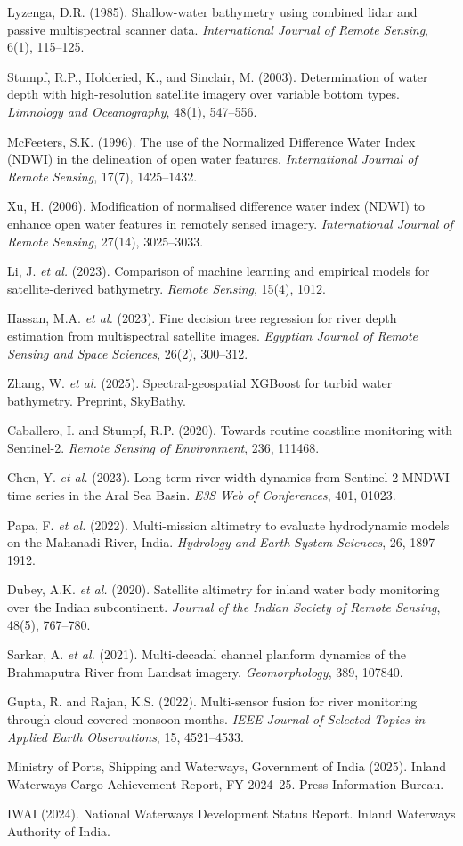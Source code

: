 \documentclass[12pt,a4paper]{article}
\begin{document}
\begin{enumerate}[leftmargin=0.7cm, label={[\arabic*]}]
\item Lyzenga, D.R. (1985). Shallow-water bathymetry using combined lidar and passive multispectral scanner data. \textit{International Journal of Remote Sensing}, 6(1), 115--125.
\item Stumpf, R.P., Holderied, K., and Sinclair, M. (2003). Determination of water depth with high-resolution satellite imagery over variable bottom types. \textit{Limnology and Oceanography}, 48(1), 547--556.
\item McFeeters, S.K. (1996). The use of the Normalized Difference Water Index (NDWI) in the delineation of open water features. \textit{International Journal of Remote Sensing}, 17(7), 1425--1432.
\item Xu, H. (2006). Modification of normalised difference water index (NDWI) to enhance open water features in remotely sensed imagery. \textit{International Journal of Remote Sensing}, 27(14), 3025--3033.
\item Li, J. \textit{et al.} (2023). Comparison of machine learning and empirical models for satellite-derived bathymetry. \textit{Remote Sensing}, 15(4), 1012.
\item Hassan, M.A. \textit{et al.} (2023). Fine decision tree regression for river depth estimation from multispectral satellite images. \textit{Egyptian Journal of Remote Sensing and Space Sciences}, 26(2), 300--312.
\item Zhang, W. \textit{et al.} (2025). Spectral-geospatial XGBoost for turbid water bathymetry. Preprint, SkyBathy.
\item Caballero, I. and Stumpf, R.P. (2020). Towards routine coastline monitoring with Sentinel-2. \textit{Remote Sensing of Environment}, 236, 111468.
\item Chen, Y. \textit{et al.} (2023). Long-term river width dynamics from Sentinel-2 MNDWI time series in the Aral Sea Basin. \textit{E3S Web of Conferences}, 401, 01023.
\item Papa, F. \textit{et al.} (2022). Multi-mission altimetry to evaluate hydrodynamic models on the Mahanadi River, India. \textit{Hydrology and Earth System Sciences}, 26, 1897--1912.
\item Dubey, A.K. \textit{et al.} (2020). Satellite altimetry for inland water body monitoring over the Indian subcontinent. \textit{Journal of the Indian Society of Remote Sensing}, 48(5), 767--780.
\item Sarkar, A. \textit{et al.} (2021). Multi-decadal channel planform dynamics of the Brahmaputra River from Landsat imagery. \textit{Geomorphology}, 389, 107840.
\item Gupta, R. and Rajan, K.S. (2022). Multi-sensor fusion for river monitoring through cloud-covered monsoon months. \textit{IEEE Journal of Selected Topics in Applied Earth Observations}, 15, 4521--4533.
\item Ministry of Ports, Shipping and Waterways, Government of India (2025). Inland Waterways Cargo Achievement Report, FY 2024--25. Press Information Bureau.
\item IWAI (2024). National Waterways Development Status Report. Inland Waterways Authority of India.
\end{enumerate}
\end{document}
